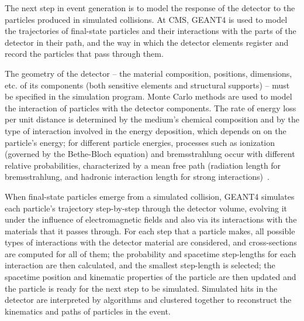 The next step in event generation is to model the response of the detector to the particles produced in simulated collisions. At CMS, GEANT4 is used to model the trajectories of final-state particles and their interactions with the parts of the detector in their path, and the way in which the detector elements register and record the particles that pass through them.

The geometry of the detector -- the material composition, positions, dimensions, etc. of its components (both sensitive elements and structural supports) -- must be specified in the simulation program. Monte Carlo methods are used to model the interaction of particles with the detector components. The rate of energy loss per unit distance is determined by the medium's chemical composition and by the type of interaction involved in the energy deposition, which depends on on the particle's energy; for different particle energies, processes such as ionization (governed by the Bethe-Bloch equation) and bremsstrahlung occur with different relative probabilities, characterized by a mean free path (radiation length for bremsstrahlung, and hadronic interaction length for strong interactions)~\cite{Tavernier:1172614}.

When final-state particles emerge from a simulated collision, GEANT4 simulates each particle's trajectory step-by-step through the detector volume, evolving it under the influence of electromagnetic fields and also via its interactions with the materials that it passes through. For each step that a particle makes, all possible types of interactions with the detector material are considered, and cross-sections are computed for all of them; the probability and spacetime step-lengths for each interaction are then calculated, and the smallest step-length is selected; the spacetime position and kinematic properties of the particle are then updated and the particle is ready for the next step to be simulated. Simulated hits in the detector are interpreted by algorithms and clustered together to reconstruct the kinematics and paths of particles in the event.

